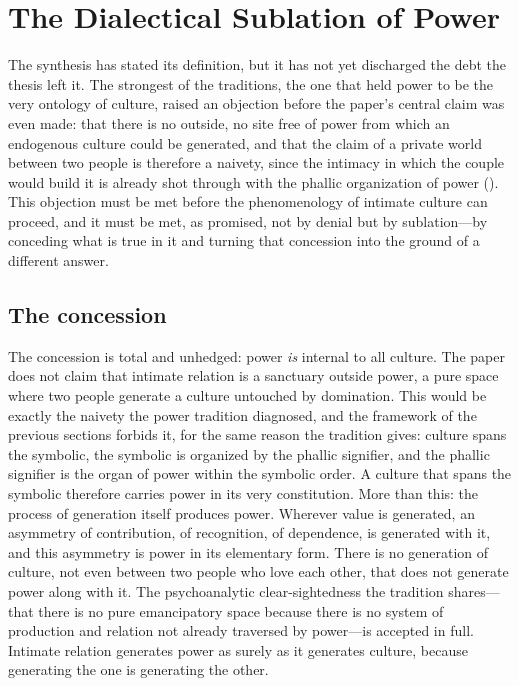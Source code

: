 \section{The Dialectical Sublation of Power}
\label{p24:sec:powersublation}

\noindent
The synthesis has stated its definition, but it has not yet discharged the debt the thesis left it. The strongest of the traditions, the one that held power to be the very ontology of culture, raised an objection before the paper's central claim was even made: that there is no outside, no site free of power from which an endogenous culture could be generated, and that the claim of a private world between two people is therefore a naivety, since the intimacy in which the couple would build it is already shot through with the phallic organization of power (). This objection must be met before the phenomenology of intimate culture can proceed, and it must be met, as promised, not by denial but by sublation---by conceding what is true in it and turning that concession into the ground of a different answer.

\subsection*{The concession}

The concession is total and unhedged: power \emph{is} internal to all culture. The paper does not claim that intimate relation is a sanctuary outside power, a pure space where two people generate a culture untouched by domination. This would be exactly the naivety the power tradition diagnosed, and the framework of the previous sections forbids it, for the same reason the tradition gives: culture spans the symbolic, the symbolic is organized by the phallic signifier, and the phallic signifier is the organ of power within the symbolic order. A culture that spans the symbolic therefore carries power in its very constitution. More than this: the process of generation itself produces power. Wherever value is generated, an asymmetry of contribution, of recognition, of dependence, is generated with it, and this asymmetry is power in its elementary form. There is no generation of culture, not even between two people who love each other, that does not generate power along with it. The psychoanalytic clear-sightedness the tradition shares---that there is no pure emancipatory space because there is no system of production and relation not already traversed by power---is accepted in full. Intimate relation generates power as surely as it generates culture, because generating the one is generating the other.

